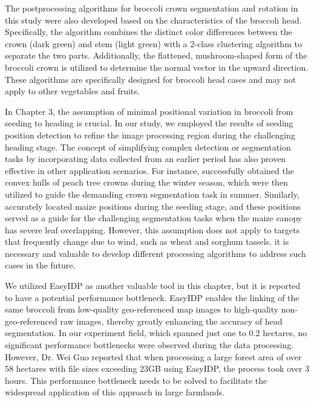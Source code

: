   The postprocessing algorithms for broccoli crown segmentation and rotation in this study were also developed based on the characteristics of the broccoli head.
  Specifically, the algorithm combines the distinct color differences between the crown (dark green) and stem (light green) with a 2-class clustering algorithm to separate the two parts.
  Additionally, the flattened, mushroom-shaped form of the broccoli crown is utilized to determine the normal vector in the upward direction.
  These algorithms are specifically designed for broccoli head cases and may not apply to other vegetables and fruits.

  In Chapter 3, the assumption of minimal positional variation in broccoli from seeding to heading is crucial. 
  In our study, we employed the results of seeding position detection to refine the image processing region during the challenging heading stage. 
  The concept of simplifying complex detection or segmentation tasks by incorporating data collected from an earlier period has also proven effective in other application scenarios. 
  For instance, \mbox{\citet{mu_characterization_2018}} successfully obtained the convex hulls of peach tree crowns during the winter season, which were then utilized to guide the demanding crown segmentation task in summer. 
  Similarly, \mbox{\citet{li_multi-source_2023}} accurately located maize positions during the seeding stage, and these positions served as a guide for the challenging segmentation tasks when the maize canopy has severe leaf overlapping. 
  However, this assumption does not apply to targets that frequently change due to wind, such as wheat and sorghum tassels. 
  it is necessary and valuable to develop different processing algorithms to address such cases in the future.

  We utilized EasyIDP as another valuable tool in this chapter, but it is reported to have a potential performance bottleneck. 
  EasyIDP enables the linking of the same broccoli from low-quality geo-referenced map images to high-quality non-geo-referenced raw images, thereby greatly enhancing the accuracy of head segmentation. 
  In our experiment field, which spanned just one to 0.2 hectares, no significant performance bottlenecks were observed during the data processing. 
  However, Dr. Wei Guo reported that when processing a large forest area of over 58 hectares with file sizes exceeding 23GB using EasyIDP, the process took over 3 hours. 
  This performance bottleneck needs to be solved to facilitate the widespread application of this approach in large farmlands.

